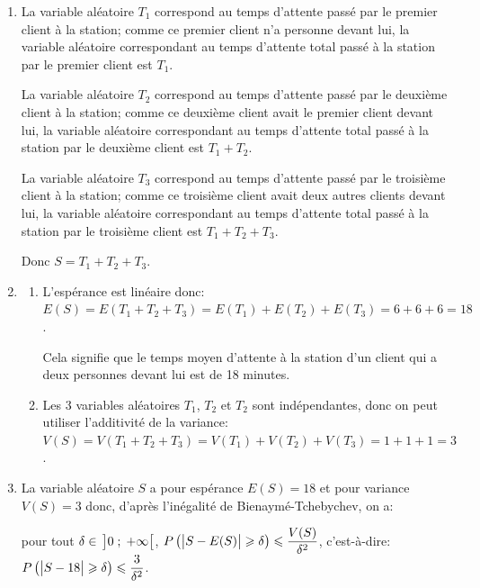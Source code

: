 \begin{enumerate}
\item
La variable aléatoire $T_1$ correspond au temps d'attente passé par le premier client à la station; comme ce premier client n'a personne devant lui, la variable aléatoire correspondant au temps d'attente total passé à la station par le premier client est $T_1$.

La variable aléatoire $T_2$ correspond au temps d'attente passé par le deuxième client à la station; comme ce deuxième client avait le premier client devant lui, la variable aléatoire correspondant au temps d'attente total passé à la station par le deuxième client est $T_1+T_2$.

La variable aléatoire $T_3$ correspond au temps d'attente passé par le troisième client à la station; comme ce troisième client avait deux autres clients devant lui, la variable aléatoire correspondant au temps d'attente total passé à la station par le troisième client est $T_1+T_2+T_3$.

Donc $S=T_1+T_2+T_3$.

\item 
	\begin{enumerate}
		\item 
L'espérance est linéaire donc:\\
$E(S)=E\left (T_1+T_2+T_3\right ) = E\left (T_1\right )+ E\left (T_2\right )+ E\left (T_3\right ) =6+6+6=18$.

Cela signifie que le temps moyen d'attente à la station d'un client qui a deux personnes devant lui est de 18 minutes.
		
		\item 
Les 3 variables aléatoires $T_1$, $T_2$ et $T_2$ sont indépendantes, donc on peut utiliser l'additivité de la variance:\\
$V(S)=V\left (T_1+T_2+T_3\right ) = V\left (T_1\right )+ V\left (T_2\right )+ V\left (T_3\right ) =1+1+1=3$.
	\end{enumerate}
	
\item
La variable aléatoire $S$ a pour espérance $E(S)=18$ et pour variance $V(S)=3$ donc, d'après l'inégalité de Bienaymé-Tchebychev, on a:

pour tout $\delta\in\, \left ]0\;;\;+\infty\strut \right [$, $P\left ( \left |S-E(S)\strut \right | \geqslant \delta \right ) \leqslant \dfrac{V(S)}{\delta^2}$,
c'est-à-dire: $P\left ( \left |S-18\strut \right | \geqslant \delta \right ) \leqslant \dfrac{3}{\delta^2}$.


\end{enumerate}
